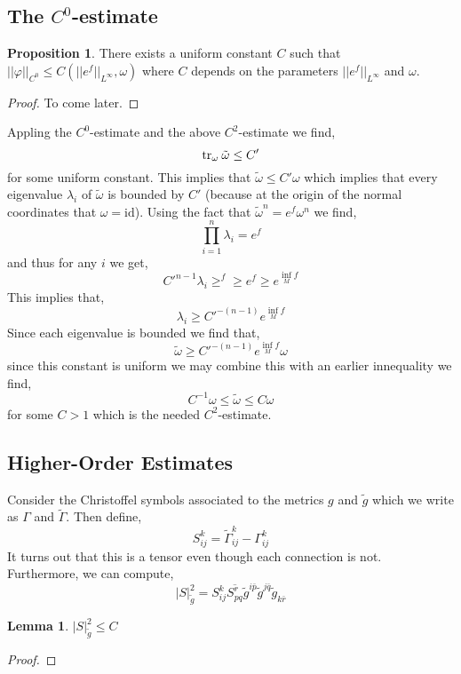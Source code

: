 \documentclass[12pt]{extarticle}
\newcommand{\id}{\mathrm{id}}
\theoremstyle{definition}
\newtheorem{lemma}[theorem]{Lemma}
\newtheorem{proposition}[theorem]{Proposition}
\begin{document}
\subsection{The $C^0$-estimate}

\begin{proposition}
There exists a uniform constant $C$ such that $||\varphi||_{C^0} \le C \left( ||e^f ||_{L^\infty}, \omega \right)$ where $C$ depends on the parameters $||e^f||_{L^\infty}$ and $\omega$.  
\end{proposition}

\begin{proof}
To come later. 
\end{proof}

Appling the $C^0$-estimate and the above $C^2$-estimate we find,
\[ \mathrm{tr}_{\omega} \:{\tilde{\omega}} \le C' \]
for some uniform constant. This implies that $\tilde{\omega} \le C' \omega$ which implies that every eigenvalue $\lambda_i$ of $\tilde{\omega}$ is bounded by $C'$ (because at the origin of the normal coordinates that $\omega = \id$). Using the fact that $\tilde{\omega}^n = e^f \omega^n$ we find,
\[ \prod_{i = 1}^n \lambda_i = e^f \]
and thus for any $i$ we get,
\[ C'^{n-1} \lambda_i \ge^f  \ge e^f \ge e^{\inf\limits_M f} \]
This implies that,
\[ \lambda_i \ge C'^{-(n-1)} e^{\inf\limits_M f} \]
Since each eigenvalue is bounded we find that,
\[ \tilde{\omega} \ge C'^{-(n-1)} e^{\inf\limits_M f} \omega \]
since this constant is uniform we may combine this with an earlier innequality we find,
\[ C^{-1} \omega \le \tilde{\omega} \le C \omega \]
for some $C > 1$ which is the needed $C^2$-estimate. 

\subsection{Higher-Order Estimates}

Consider the Christoffel symbols associated to the metrics $g$ and $\tilde{g}$ which we write as $\Gamma$ and $\tilde{\Gamma}$. Then define,
\[ S^k_{ij} = \tilde{\Gamma}^k_{ij} - \Gamma^k_{ij} \]
It turns out that this is a tensor even though each connection is not. Furthermore, we can compute,
\[ |S|_{\tilde{g}}^2 = S^k_{ij} \overline{S^r_{pq}} \tilde{g}^{i \bar{p}} \tilde{g}^{j \bar{q}} \tilde{g}_{k \bar{r}} \]
\begin{lemma}
$|S|^2_{\tilde{g}} \le C$
\end{lemma}

\begin{proof}

\end{proof}
\end{document}
